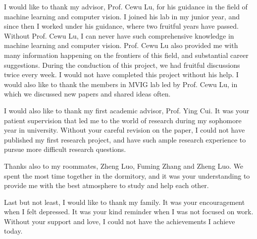 \begin{thanks}

I would like to thank my advisor, Prof. Cewu Lu, for his guidance in the field of machine learning and computer vision. I joined his lab in my junior year, and since then I worked under his guidance, where two fruitful years have passed. Without Prof. Cewu Lu, I can never have such comprehensive knowledge in machine learning and computer vision. Prof. Cewu Lu also provided me with many information happening on the frontiers of this field, and substantial career suggestions. During the conduction of this project, we had fruitful discussions twice every week. I would not have completed this project without his help. I would also like to thank the members in MVIG lab led by Prof. Cewu Lu, in which we discussed new papers and shared ideas often.

I would also like to thank my first academic advisor, Prof. Ying Cui. It was your patient supervision that led me to the world of research during my sophomore year in university. Without your careful revision on the paper, I could not have published my first research project, and have such ample research experience to pursue more difficult research questions.

Thanks also to my roommates, Zheng Luo, Fuming Zhang and Zheng Luo. We spent the most time together in the dormitory, and it was your understanding to provide me with the best atmosphere to study and help each other.

Last but not least, I would like to thank my family. It was your encouragement when I felt depressed. It was your kind reminder when I was not focused on work. Without your support and love, I could not have the achievements I achieve today.

\end{thanks}
